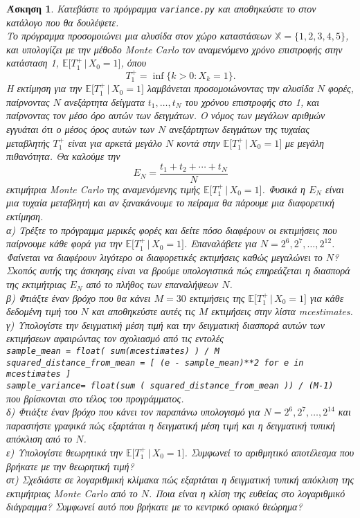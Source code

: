 \documentclass[11pt]{article}
\newcommand{\en}[1]{\textlatin{#1}}
\newtheorem{exercise}{Άσκηση}
\def\X{\mathbb{X}}
\def\E{\mathbb{E}}
\newcommand{\EE}[1]{\E\big[#1\big]}
\begin{document}
\begin{exercise}
Κατεβάστε το πρόγραμμα \en{{\tt variance.py}} και αποθηκεύστε το στον κατάλογο που θα δουλέψετε. \\[2mm]
Το πρόγραμμα προσομοιώνει μια αλυσίδα στον χώρο καταστάσεων $\X=\{1,2,3,4,5\}$, και υπολογίζει με την μέθοδο \en{Monte Carlo} τον αναμενόμενο χρόνο επιστροφής στην κατάσταση 1, $\EE{T_1^+\,|\,X_0=1}$, όπου
\[
T_1^+=\inf\{k>0: X_k=1\}.
\]
H εκτίμηση για την $\EE{T_1^+\,|\,X_0=1}$ λαμβάνεται προσομοιώνοντας την αλυσίδα $N$ φορές, παίρνοντας $N$ ανεξάρτητα δείγματα $t_1,\ldots,t_N$ του χρόνου επιστροφής στο 1, και παίρνοντας τον μέσο όρο αυτών των δειγμάτων.
O νόμος των μεγάλων αριθμών εγγυάται ότι ο μέσος όρος αυτών των $N$ ανεξάρτητων δειγμάτων της τυχαίας μεταβλητής $T_1^+$ είναι για αρκετά μεγάλο $N$ κοντά στην $\EE{T_1^+\,|\,X_0=1}$ με μεγάλη πιθανότητα. Θα καλούμε την
\[
Ε_N=\frac{t_1+t_2+\cdots+t_N}{N}
\]
εκτιμήτρια \en{Monte Carlo} της αναμενόμενης τιμής $\EE{T_1^+\,|\,X_0=1}$. Φυσικά η $E_N$ είναι μια τυχαία μεταβλητή και αν ξανακάνουμε το πείραμα θα πάρουμε μια διαφορετική εκτίμηση. \\[2mm]
α) Τρέξτε το πρόγραμμα μερικές φορές και δείτε πόσο διαφέρουν οι εκτιμήσεις που παίρνουμε κάθε φορά για την $\EE{T_1^+\,|\,X_0=1}$. Επαναλάβετε για $N=2^6,2^7,\ldots,2^{12}$. Φαίνεται να διαφέρουν λιγότερο οι διαφορετικές εκτιμήσεις καθώς μεγαλώνει το $N$?\\[2mm]
Σκοπός αυτής της άσκησης είναι να βρούμε υπολογιστικά πώς επηρεάζεται η διασπορά της εκτιμήτριας $E_N$ από το πλήθος των επαναλήψεων $N$.\\[2mm]
β) Φτιάξτε έναν βρόχο που θα κάνει $M=30$ εκτιμήσεις της $\EE{T_1^+\,|\,X_0=1}$ για κάθε δεδομένη τιμή του $N$ και αποθηκεύστε αυτές τις $Μ$ εκτιμήσεις στην λίστα \en{mcestimates}.\\[2mm]
γ) Υπολογίστε την δειγματική μέση τιμή και την δειγματική διασπορά αυτών των εκτιμήσεων αφαιρώντας τον σχολιασμό από τις εντολές\\[1mm]
\en{{\tt sample\_mean = float( sum(mcestimates) ) / M}}\\[0.5mm]
\en{{\tt squared\_distance\_from\_mean = [ (e - sample\_mean)**2 for e in mcestimates ]}}\\[0.5mm]
\en{{\tt sample\_variance= float(sum ( squared\_distance\_from\_mean )) / (M-1)}}\\[0.5mm]
που βρίσκονται στο τέλος του προγράμματος.\\[2mm]
δ) Φτιάξτε έναν βρόχο που κάνει τον παραπάνω υπολογισμό για $N=2^6,2^7,\ldots,2^{14}$ και παραστήστε γραφικά πώς εξαρτάται η δειγματική μέση τιμή και η δειγματική τυπική απόκλιση από το $N$.\\[2mm]
ε) Υπολογίστε θεωρητικά την $\EE{T_1^+\,|\,X_0=1}$. Συμφωνεί το αριθμητικό αποτέλεσμα που βρήκατε με την θεωρητική τιμή?\\[2mm]
στ) Σχεδιάστε σε λογαριθμική κλίμακα πώς εξαρτάται η δειγματική τυπική απόκλιση της εκτιμήτριας \en{Monte Carlo} από το $N$. Ποια είναι η κλίση της ευθείας στο λογαριθμικό διάγραμμα? Συμφωνεί αυτό που βρήκατε με το κεντρικό οριακό θεώρημα?
\end{exercise}
\end{document}
